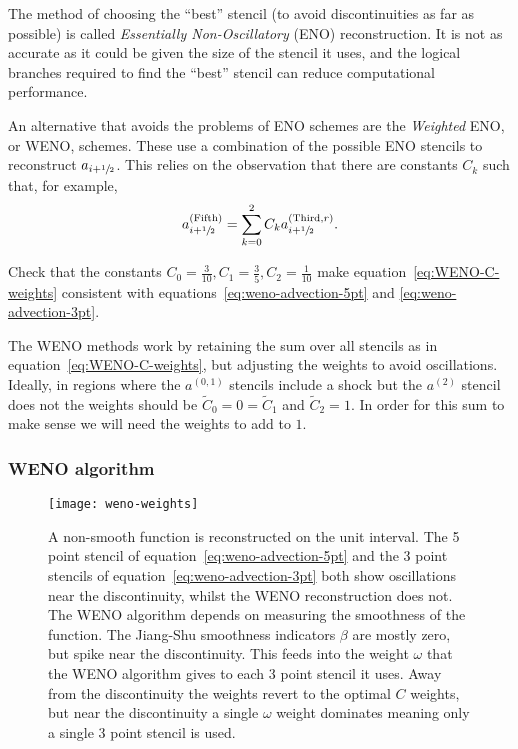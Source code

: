 The method of choosing the ``best'' stencil (to avoid discontinuities as far as
possible) is called \emph{Essentially Non-Oscillatory} (ENO) reconstruction. It
is not as accurate as it could be given the size of the stencil it uses, and
the logical branches required to find the ``best'' stencil can reduce
computational performance.

An alternative that avoids the problems of ENO schemes are the \emph{Weighted}
ENO, or WENO, schemes. These use a combination of the possible ENO stencils to
reconstruct $a_{i+{\sfrac{1}{2}}}$. This relies on the observation that there are
constants $C_k$ such that, for example,
\begin{equation}
  \label{eq:WENO-C-weights}
  a^{(\text{Fifth})}_{i+{\sfrac{1}{2}}} = \sum_{k=0}^{2} C_k a^{(\text{Third}, r)}_{i+{\sfrac{1}{2}}}.
\end{equation}

\begin{exercise}
{Check that the constants $C_0 = \tfrac{3}{10}, C_1 = \tfrac{3}{5}, C_2 =
\tfrac{1}{10}$ make equation~\eqref{eq:WENO-C-weights} consistent with
equations~\eqref{eq:weno-advection-5pt} and \eqref{eq:weno-advection-3pt}.}
\end{exercise}

The WENO methods work by retaining the sum over all stencils as in
equation~\eqref{eq:WENO-C-weights}, but adjusting the weights to avoid
oscillations. Ideally, in regions where the $a^{(0,1)}$ stencils include a
shock but the $a^{(2)}$ stencil does not the weights should be $\tilde{C}_0 = 0
= \tilde{C}_1$ and $\tilde{C}_2 = 1$. In order for this sum to make sense we
will need the weights to add to $1$.

\subsubsection{WENO algorithm}
\label{sec:WENO-algorithm}

\begin{figure}
  \texttt{[image: weno-weights]}
  \caption[WENO reconstruction and weights]{A non-smooth function is reconstructed on the unit interval. The 5 point stencil of equation~\eqref{eq:weno-advection-5pt} and the 3 point stencils of equation~\eqref{eq:weno-advection-3pt} both show oscillations near the discontinuity, whilst the WENO reconstruction does not. The WENO algorithm depends on measuring the smoothness of the function. The Jiang-Shu smoothness indicators $\beta$ are mostly zero, but spike near the discontinuity. This feeds into the weight $\omega$ that the WENO algorithm gives to each 3 point stencil it uses. Away from the discontinuity the weights revert to the optimal $C$ weights, but near the discontinuity a single $\omega$ weight dominates meaning only a single 3 point stencil is used.}
  \label{fig:weno-weights}
\end{figure}

